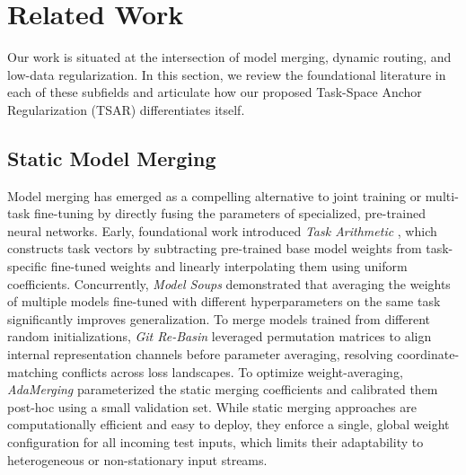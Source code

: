\section{Related Work}
\label{sec:related_work}

Our work is situated at the intersection of model merging, dynamic routing, and low-data
regularization. In this section, we review the foundational literature in each of these subfields
and articulate how our proposed Task-Space Anchor Regularization (TSAR) differentiates itself.

\subsection{Static Model Merging}
Model merging has emerged as a compelling alternative to joint training or multi-task fine-tuning
by directly fusing the parameters of specialized, pre-trained neural networks. Early, foundational
work introduced \emph{Task Arithmetic} \cite{ilharco2022editing}, which constructs task vectors by
subtracting pre-trained base model weights from task-specific fine-tuned weights and linearly
interpolating them using uniform coefficients. Concurrently, \emph{Model Soups}
\cite{wortsman2022model} demonstrated that averaging the weights of multiple models fine-tuned with
different hyperparameters on the same task significantly improves generalization. To merge models
trained from different random initializations, \emph{Git Re-Basin} \cite{ainsworth2022git} leveraged
permutation matrices to align internal representation channels before parameter averaging, resolving
coordinate-matching conflicts across loss landscapes. To optimize weight-averaging,
\emph{AdaMerging} \cite{yang2023adamerging} parameterized the static merging coefficients and
calibrated them post-hoc using a small validation set. While static merging approaches are
computationally efficient and easy to deploy, they enforce a single, global weight configuration for
all incoming test inputs, which limits their adaptability to heterogeneous or non-stationary input
streams.

